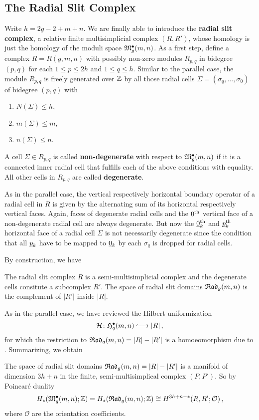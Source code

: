\subsection{The Radial Slit Complex}
\label{cellular_models:radial:bisimplicial_complex}
Write $h = 2 g - 2 + m + n$. 
We are finally able to introduce the \textbf{radial slit complex}, a relative finite multisimplicial complex $(R, R')$, 
whose homology is just the homology of the moduli space $\mathfrak{M}^\bullet_g(m, n)$.
As a first step, define a complex $R = R(g, m, n)$ with possibly non-zero modules $\overline R_{p, q}$ in bidegree $(p, q)$ for each $1 \leq p \leq 2 h$ and $1 \leq q \leq h$.
Similar to the parallel case, the module $R_{p, q}$ is freely generated over $\mathbb Z$ by all those radial cells $\Sigma = (\sigma_q, \dotsc, \sigma_0)$ of bidegree $(p, q)$ with
\begin{enumerate}
\item $N(\Sigma) \leq h$,
\item $m(\Sigma) \leq m$,
\item $n(\Sigma) \leq n$.
\end{enumerate}

A cell $\Sigma \in R_{p, q}$ is called \textbf{non-degenerate} with respect to $\mathfrak{M}^\bullet_g(m, n)$
if it is a connected inner radial cell that fulfills each of the above conditions with equality.
All other cells in $R_{p, q}$ are called \textbf{degenerate}.

As in the parallel case, the vertical respectively horizontal boundary operator of a radial cell in $R$ is given by the alternating sum of its horizontal respectively vertical faces.
Again, faces of degenerate radial cells and the $0^{\text{th}}$ vertical face of a non-degenerate radial cell are always degenerate.
But now the $\underline{\smash{0}}_k^{\text{th}}$ and $\underline{\smash{p}}_k^{\text{th}}$ horizontal face of a radial cell $\Sigma$ is not necessarily degenerate 
since the condition that all $\underline{\smash{p}}_k$ have to be mapped to $\underline{\smash{0}}_k$ by each $\sigma_q$ is dropped for radial cells.

By construction, we have

\begin{thm}
   The radial slit complex $R$ is a semi-multisimplicial complex and the degenerate cells consitute a subcomplex $R'$.
   The space of radial slit domains ${\mathfrak{Rad}_g(m,n)}$ is the complement of $|R'|$ inside $|R|$.
\end{thm}

As in the parallel case, we have reviewed the Hilbert uniformization
\[
   \mathcal H \colon \mathfrak{H}^{\bullet}_g(m, n) \xhookrightarrow{\hspace{6pt}{}\hspace{6pt}} |R| \,,
\]
for which the restriction to ${\mathfrak{Rad}_g(m,n)} = |R| - |R'|$ is a homoeomorphism due to \cite{Boedigheimer2006}.
Summarizing, we obtain
\begin{thm}
   The space of radial slit domains ${\mathfrak{Rad}_g(m,n)} = |R| - |R'|$ is a manifold of dimension $3h + n$ in the finite, semi-multisimplical complex $(P,P')$.
   So by Poincaré duality
    \[
       H_\ast( \mathfrak{M}^\bullet_g(m, n); \mathbb Z ) = H_\ast( {\mathfrak{Rad}_g(m,n)}; \mathbb Z ) \cong H^{3h+n-\ast}( R, R'; \mathcal O)\,,
    \]
    where $\mathcal O$ are the orientation coefficients.
\end{thm}

